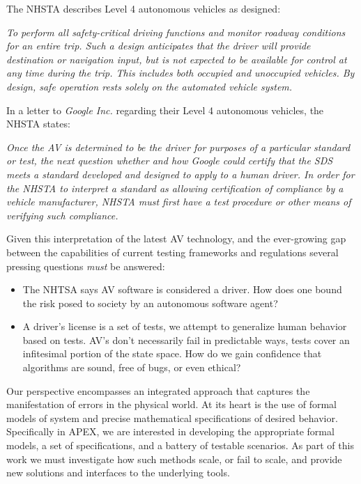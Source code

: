 The NHSTA describes Level 4 autonomous vehicles as designed:
\begin{displayquote}
	\emph{To perform all safety-critical driving functions and monitor roadway conditions for an entire trip. Such a design anticipates that the driver will provide destination or navigation input, but is not expected to be available for control at any time during the trip. This includes both occupied and unoccupied vehicles. By design, safe operation rests solely on the automated vehicle system.} 
\end{displayquote}

In a letter to \emph{Google Inc.} regarding their Level 4 autonomous vehicles, the NHSTA states:
\begin{displayquote}
	\emph{Once the AV is determined to be the driver for purposes of a particular standard or test, the next question whether and how Google could certify that the SDS meets a standard developed and designed to apply to a human driver. In order for the NHSTA to interpret a standard as allowing certification of compliance by a vehicle manufacturer, NHSTA must first have a test procedure or other means of verifying such compliance.}
\end{displayquote}

Given this interpretation of the latest AV technology, and the ever-growing gap between the capabilities of current testing frameworks and regulations several pressing questions \emph{must} be answered:
\begin{itemize}
	\item The NHTSA says AV software is considered a driver. How does one bound the risk posed to society by an autonomous software agent?
	\item A driver's license is a set of tests, we attempt to generalize human behavior based on tests. AV's don't necessarily fail in predictable ways, tests cover an infitesimal portion of the state space. How do we gain confidence that algorithms are sound, free of bugs, or even ethical?
\end{itemize}

Our perspective encompasses an integrated approach that captures the manifestation of errors in the physical world. At its heart is the use of formal models of system and precise mathematical specifications of desired behavior. Specifically in APEX, we are interested in developing the appropriate formal models, a set of specifications, and a battery of testable scenarios. As part of this work we must investigate how such methods scale, or fail to scale, and provide new solutions and interfaces to the underlying tools. 

